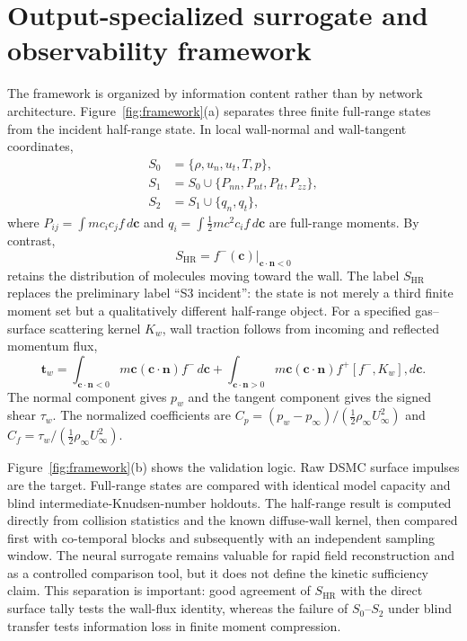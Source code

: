\documentclass[aip,pof,preprint,notitlepage,floatfix,amsmath,amssymb]{revtex4-2}
\begin{document}
\section{Output-specialized surrogate and observability framework}
The framework is organized by information content rather than by network architecture. Figure~\ref{fig:framework}(a) separates three finite full-range states from the incident half-range state. In local wall-normal and wall-tangent coordinates,
\begin{align}
S_0 &= \{\rho,u_n,u_t,T,p\},\\
S_1 &= S_0\cup\{P_{nn},P_{nt},P_{tt},P_{zz}\},\\
S_2 &= S_1\cup\{q_n,q_t\},
\end{align}
where $P_{ij}=\int m c_i c_j f\,d\bm{c}$ and $q_i=\int \tfrac12m c^2c_i f\,d\bm{c}$ are full-range moments. By contrast,
\begin{equation}
S_{\mathrm{HR}}=f^{-}(\bm{c})\big|_{\bm{c}\cdot\bm{n}<0}
\end{equation}
retains the distribution of molecules moving toward the wall. The label $S_{\mathrm{HR}}$ replaces the preliminary label ``S3 incident'': the state is not merely a third finite moment set but a qualitatively different half-range object. For a specified gas--surface scattering kernel $K_w$, wall traction follows from incoming and reflected momentum flux,
\begin{equation}
\bm{t}_w=\int_{\bm{c}\cdot\bm{n}<0}m\bm{c}(\bm{c}\cdot\bm{n})f^{-}\,d\bm{c}
 +\int_{\bm{c}\cdot\bm{n}>0}m\bm{c}(\bm{c}\cdot\bm{n})f^{+}[f^{-},K_w],d\bm{c}.
\label{eq:walltraction}
\end{equation}
The normal component gives $p_w$ and the tangent component gives the signed shear $\tau_w$. The normalized coefficients are $C_p=(p_w-p_\infty)/(\tfrac12\rho_\infty U_\infty^2)$ and $C_f=\tau_w/(\tfrac12\rho_\infty U_\infty^2)$.

Figure~\ref{fig:framework}(b) shows the validation logic. Raw DSMC surface impulses are the target. Full-range states are compared with identical model capacity and blind intermediate-Knudsen-number holdouts. The half-range result is computed directly from collision statistics and the known diffuse-wall kernel, then compared first with co-temporal blocks and subsequently with an independent sampling window. The neural surrogate remains valuable for rapid field reconstruction and as a controlled comparison tool, but it does not define the kinetic sufficiency claim. This separation is important: good agreement of $S_{\mathrm{HR}}$ with the direct surface tally tests the wall-flux identity, whereas the failure of $S_0$--$S_2$ under blind transfer tests information loss in finite moment compression.
\end{document}
